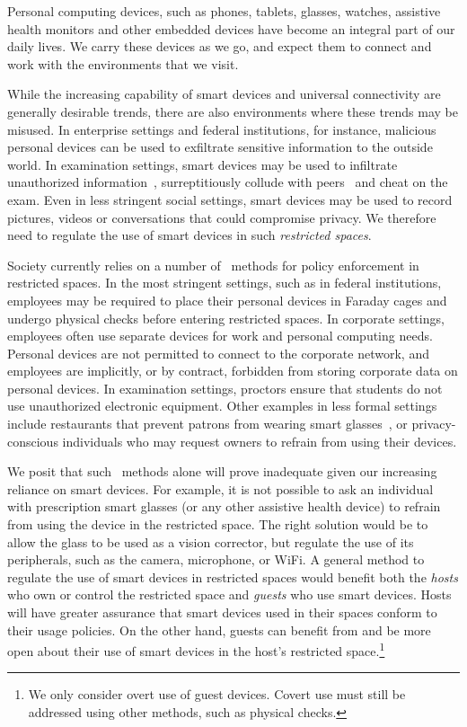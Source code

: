 \label{section:introduction}


Personal computing devices, such as phones, tablets, glasses, watches,
assistive health monitors and other embedded devices have become an integral
part of our daily lives. We carry these devices as we go, and expect them to
connect and work with the environments that we visit.

While the increasing capability of smart devices and universal connectivity are
generally desirable trends, there are also environments where these trends may
be misused. In enterprise settings and federal institutions, for instance,
malicious personal devices can be used to exfiltrate sensitive information to
the outside world. In examination settings, smart devices may be used to
infiltrate unauthorized information~\cite{url:examcheating}, surreptitiously
collude with peers~\cite{smartwatch:fc14} and cheat on the exam.  Even in less
stringent social settings, smart devices may be used to record pictures, videos
or conversations that could compromise privacy. We therefore need to regulate
the use of smart devices in such \textit{restricted spaces}.

Society currently relies on a number of \adhoc\ methods for policy enforcement
in restricted spaces. In the most stringent settings, such as in federal
institutions, employees may be required to place their personal devices in
Faraday cages and undergo physical checks before entering restricted spaces.
In corporate settings, employees often use separate devices for work and
personal computing needs. Personal devices are not permitted to connect to the
corporate network, and employees are implicitly, or by contract, forbidden from
storing corporate data on personal devices. In examination settings, proctors
ensure that students do not use unauthorized electronic equipment.  Other
examples in less formal settings include restaurants that prevent patrons from
wearing smart glasses~\cite{url:glassban}, or privacy-conscious individuals who
may request owners to refrain from using their devices.

We posit that such \adhoc\ methods alone will prove inadequate given our
increasing reliance on smart devices. For example, it is not possible to ask an
individual with prescription smart glasses (or any other assistive health
device) to refrain from using the device in the restricted space. The right
solution would be to allow the glass to be used as a vision corrector, but
regulate the use of its peripherals, such as the camera, microphone, or WiFi.
A general method to regulate the use of smart devices in restricted spaces
would benefit both the \textit{hosts} who own or control the restricted space
and \textit{guests} who use smart devices.  Hosts will have greater assurance
that smart devices used in their spaces conform to their usage policies. On the
other hand, guests can benefit from and be more open about their use of smart
devices in the host's restricted space.\footnote{We only consider overt use of
guest devices.  Covert use must still be addressed using other methods, such as
physical checks.}

